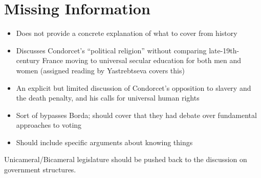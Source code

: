\section{Missing Information}

\begin{itemize}
    \item Does not provide a concrete explanation of what to cover from history

    \item Discusses Condorcet's ``political religion'' without comparing late-19th-century France moving to universal secular education for both men and women (assigned reading by Yastrebtseva covers this)

    \item An explicit but limited discussion of Condorcet's opposition to slavery and the death penalty, and his calls for universal human rights

    \item Sort of bypasses Borda; should cover that they had debate over fundamental approaches to voting

    \item Should  include specific arguments about knowing things
\end{itemize}

Unicameral/Bicameral legislature should be pushed back to the discussion on government structures.